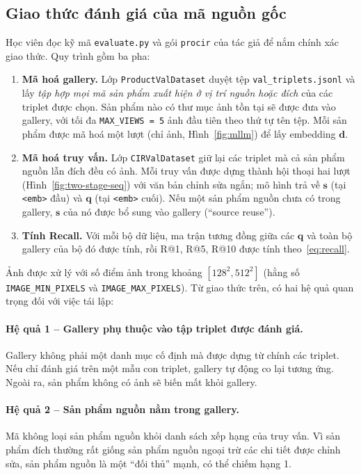 \subsection{Giao thức đánh giá của mã nguồn gốc}\label{sec:protocol}

Học viên đọc kỹ mã \texttt{evaluate.py} và gói \texttt{procir} của tác giả để nắm chính xác giao thức. Quy trình gồm ba pha:

\begin{enumerate}
    \item \textbf{Mã hoá gallery.} Lớp \texttt{ProductValDataset} duyệt tệp \texttt{val\_triplets.jsonl} và lấy \emph{tập hợp mọi mã sản phẩm xuất hiện ở vị trí nguồn hoặc đích} của các triplet được chọn. Sản phẩm nào có thư mục ảnh tồn tại sẽ được đưa vào gallery, với tối đa \texttt{MAX\_VIEWS = 5} ảnh đầu tiên theo thứ tự tên tệp. Mỗi sản phẩm được mã hoá một lượt (chỉ ảnh, Hình~\ref{fig:mllm}) để lấy embedding $\mathbf{d}$.
    \item \textbf{Mã hoá truy vấn.} Lớp \texttt{CIRValDataset} giữ lại các triplet mà cả sản phẩm nguồn lẫn đích đều có ảnh. Mỗi truy vấn được dựng thành hội thoại hai lượt (Hình~\ref{fig:two-stage-seq}) với văn bản chỉnh sửa ngắn; mô hình trả về $\mathbf{s}$ (tại \texttt{<emb>} đầu) và $\mathbf{q}$ (tại \texttt{<emb>} cuối). Nếu một sản phẩm nguồn chưa có trong gallery, $\mathbf{s}$ của nó được bổ sung vào gallery (``source reuse'').
    \item \textbf{Tính Recall.} Với mỗi bộ dữ liệu, ma trận tương đồng giữa các $\mathbf{q}$ và toàn bộ gallery của bộ đó được tính, rồi R@1, R@5, R@10 được tính theo~\eqref{eq:recall}.
\end{enumerate}

Ảnh được xử lý với số điểm ảnh trong khoảng $[128^2, 512^2]$ (hằng số \texttt{IMAGE\_MIN\_PIXELS} và \texttt{IMAGE\_MAX\_PIXELS}). Từ giao thức trên, có hai hệ quả quan trọng đối với việc tái lập:

\paragraph{Hệ quả 1 -- Gallery phụ thuộc vào tập triplet được đánh giá.} Gallery không phải một danh mục cố định mà được dựng từ chính các triplet. Nếu chỉ đánh giá trên một mẫu con triplet, gallery tự động co lại tương ứng. Ngoài ra, sản phẩm không có ảnh sẽ biến mất khỏi gallery.

\paragraph{Hệ quả 2 -- Sản phẩm nguồn nằm trong gallery.} Mã không loại sản phẩm nguồn khỏi danh sách xếp hạng của truy vấn. Vì sản phẩm đích thường rất giống sản phẩm nguồn ngoại trừ các chi tiết được chỉnh sửa, sản phẩm nguồn là một ``đối thủ'' mạnh, có thể chiếm hạng 1.

